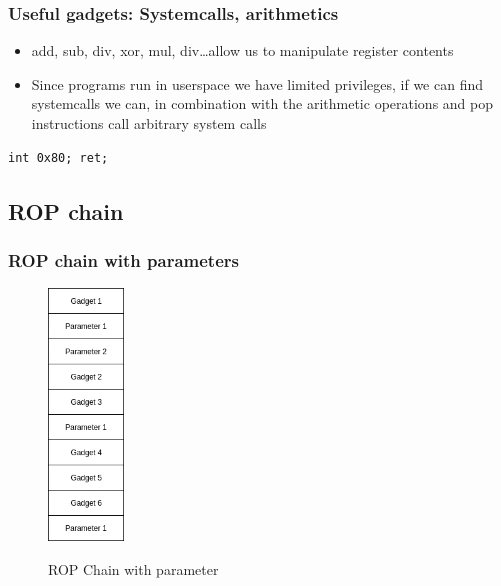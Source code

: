 \documentclass[11pt]{beamer}
\begin{document}
\begin{frame}[fragile]
    \frametitle{Useful gadgets: Systemcalls, arithmetics}
    \begin{itemize}
        \item add, sub, div, xor, mul, div\ldots allow us to manipulate register contents
        \item Since programs run in userspace we have limited privileges, if we can find systemcalls we can, in combination with the arithmetic operations and pop instructions call arbitrary system calls
    \end{itemize}
\begin{lstlisting}[style=result]
int 0x80; ret;
\end{lstlisting}
\end{frame}
\subsection{ROP chain}
\begin{frame}
    \frametitle{ROP chain with parameters}
    \begin{figure}[h]
        \caption{ROP Chain with parameter}
        \centering
        \includegraphics[width=0.18\textwidth]{./img/gadgetstack.png}\label{gadget2}
    \end{figure}
\end{frame}
\end{document}
